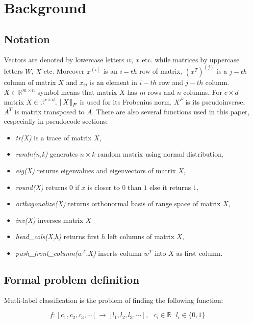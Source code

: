 
\chapter{Background}
\section{Notation}

Vectors are denoted by lowercase letters $w$, $x$ etc. while matrices by uppercase letters $W$, $X$ etc. Moreover $x^{(i)}$ is an $i-th$ row of matrix, $(x^T)^{(j)}$ is a $j-th$ column of matrix $X$ and $x_{ij}$ is an element in $i-th$ row and $j-th$ column. $X \in \mathbb{R}^{m \times n}$ symbol means that matrix $X$ has $m$ rows and $n$ columns. For $c \times d$  matrix $X \in \mathbb{R}^{c \times d}$, $\left\lVert X\right\rVert_{F}$ is used for its Frobenius norm, $X^P$ is its pseudoinverse, $A^T$ is matrix transposed to $A$. 
There are also several functions used in this paper, ecspecially in pseudocode sections:
\begin{itemize}
\item \textit{tr(X)} is a trace of matrix $X$, 
\item \textit{randn(n,k)} generates $n \times k$ random matrix using normal distribution,
\item \textit{eig(X)} returns eigenvalues and eigenvectors of matrix $X$,
\item \textit{round(X)} returns $0$ if $x$ is closer to $0$ than $1$ else it returns $1$,
\item \textit{orthogonalize(X)} returns orthonormal basis of range space of matrix $X$,
\item \textit{inv(X)} inverses matrix $X$
\item \textit{head\_cols(X,h)} returns first $h$ left columns of matrix $X$,
\item \textit{push\_front\_column($w^T$,X)} inserts column $w^T$ into $X$ as first column.

\end{itemize}

\section{Formal problem definition}
Mutli-label classification is the problem of finding the following function: 

\begin{equation}\label{eq:def}
    f: [c_1, c_2, c_3, \cdots] \rightarrow [l_1, l_2, l_3, \cdots], \text{ } c_i \in \mathbb{R} \text{ } l_i \in \{0,1\} 
\end{equation}


